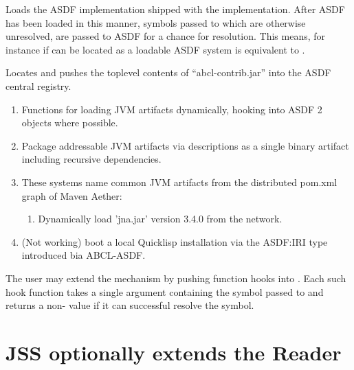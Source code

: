 \documentclass[10pt]{book}
\begin{document}
\begin{description}

  \item{} Loads the \textsc{ASDF} implementation shipped
    with the implementation.  After \textsc{ASDF} has been loaded in
    this manner, symbols passed to  which are
    otherwise unresolved, are passed to ASDF for a chance for
    resolution.  This means, for instance if  can be
    located as a loadable \textsc{ASDF} system  is equivalent to .

  \item{} Locates and pushes the toplevel contents of
    ``abcl-contrib.jar'' into the \textsc{ASDF} central registry.  

    \begin{enumerate}
      \item {}
        Functions for loading JVM artifacts dynamically, hooking into ASDF 2 objects where possible.
      \item {} Package addressable JVM artifacts via
         descriptions as a single binary artifact
        including recursive dependencies.
      \item {}
        These systems name common JVM artifacts from the distributed pom.xml graph of Maven Aether:
        \begin{enumerate}
          \item {} Dynamically load 'jna.jar' version 3.4.0 from the network.
        \end{enumerate}
      \item {} (Not working) boot a local Quicklisp
        installation via the ASDF:IRI type introduced bia ABCL-ASDF.
        
    \end{enumerate}

\end{description}

The user may extend the  mechanism by pushing
function hooks into .  Each
such hook function takes a single argument containing the symbol
passed to  and returns a non- value if it
can successful resolve the symbol.

\section{JSS optionally extends the Reader}
\end{document}
